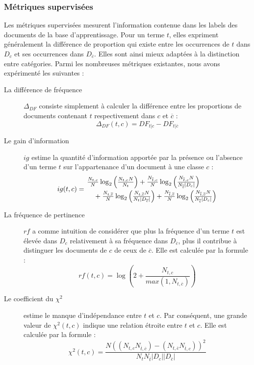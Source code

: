 \subsubsection{Métriques supervisées}
\label{sec:quanta:poids-globaux-superv}
Les métriques supervisées mesurent l'information contenue dans les labels des documents de la base d'apprentissage. Pour un terme $t$, elles expriment généralement la différence de proportion qui existe entre les occurrences de $t$ dans $D_c$ et ses occurrences dans $D_{\overline{c}}$. Elles sont ainsi mieux adaptées à la distinction entre catégories. Parmi les nombreuses métriques existantes, nous avons expérimenté les suivantes : 
\begin{description}
	\item[La différence de fréquence] $\Delta_{DF}$ consiste simplement à calculer la différence entre les proportions de documents contenant $t$ respectivement dans $c$ et $\overline{c}$ :
	\[\Delta_{DF}(t,c) = DF_{t \vert c} - DF_{t \vert \overline{c}}\]
	\item[Le gain d'information] $ig$ \citep{yang1997IGandIMandCHIandTS} estime la quantité d'information apportée par la présence ou l'absence d'un terme $t$ sur l'appartenance d'un document à une classe $c$ :
	\begin{equation*} %
	ig(t, c) = \splitdfrac{\frac{N_{t,c}}{N} \log_2 \left(\frac{N_{t,c}N}{N_{t}}\right)
		 + \frac{N_{\overline{t},c}}{N} \log_2 \left(\frac{N_{\overline{t},c}N}{N_{\overline{t}}\vert D_c \vert}\right)}
	{+ \frac{N_{t,\overline{c}}}{N} \log_2 \left(\frac{N_{t,\overline{c}}N}{N_{t}\vert D_{\overline{c}}\vert}\right)
	+ \frac{N_{\overline{t},\overline{c}}}{N} \log_2 \left(\frac{N_{\overline{t},\overline{c}}N}{N_{\overline{t}}\vert D_c \vert}\right)}
	\end{equation*}
	\item[La fréquence de pertinence] $rf$ \citep{lan2009rf} a comme intuition de considérer que plus la fréquence d'un terme $t$ est élevée dans $D_c$ relativement à sa fréquence dans $D_{\overline{c}}$, plus il contribue à distinguer les documents de $c$ de ceux de $\overline{c}$. Elle est calculée par la formule :
	\[rf(t,c) = \log\left(2 + \frac{N_{t,c}}{max(1, N_{t,\overline{c}})}\right)\]
	\item[Le coefficient du $\chi^2$] \citep{schutze1995chi2} estime le manque d'indépendance entre $t$ et $c$. Par conséquent, une grande valeur de $\chi^2(t,c)$ indique une relation étroite entre $t$ et $c$. Elle est calculée par la formule :
	\[\chi^2(t,c) = \frac{N ((N_{t,c} N_{\overline{t},\overline{c}}) - (N_{t,\overline{c}} N_{\overline{t},c}))^2}{N_t N_{\overline{t}} \vert D_c \vert \vert D_{\overline{c}} \vert }\]

\end{description}
